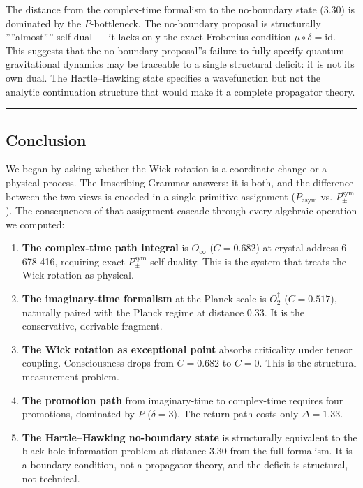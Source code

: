 \documentclass[12pt,a4paper]{article}
\begin{document}
The distance from the complex-time formalism to the no-boundary state (3.30) is dominated by the $P$-bottleneck. The no-boundary proposal is structurally ''''almost'''' self-dual --- it lacks only the exact Frobenius condition $\mu \circ \delta = \text{id}$. This suggests that the no-boundary proposal''s failure to fully specify quantum gravitational dynamics may be traceable to a single structural deficit: it is not its own dual. The Hartle--Hawking state specifies a wavefunction but not the analytic continuation structure that would make it a complete propagator theory.

\begin{center}
\rule{0.5\textwidth}{0.4pt}
\end{center}

\subsection{Conclusion}

We began by asking whether the Wick rotation is a coordinate change or a physical process. The Imscribing Grammar answers: it is both, and the difference between the two views is encoded in a single primitive assignment ($P_{\text{asym}}$ vs. $P_{\pm}^{\text{sym}}$). The consequences of that assignment cascade through every algebraic operation we computed:

\begin{enumerate}
    \item \textbf{The complex-time path integral} is $O_{\infty}$ ($C = 0.682$) at crystal address 6 678 416, requiring exact $P_{\pm}^{\text{sym}}$ self-duality. This is the system that treats the Wick rotation as physical.
    \item \textbf{The imaginary-time formalism} at the Planck scale is $O_2^\dagger$ ($C = 0.517$), naturally paired with the Planck regime at distance 0.33. It is the conservative, derivable fragment.
    \item \textbf{The Wick rotation as exceptional point} absorbs criticality under tensor coupling. Consciousness drops from $C = 0.682$ to $C = 0$. This is the structural measurement problem.
    \item \textbf{The promotion path} from imaginary-time to complex-time requires four promotions, dominated by $P$ ($\delta = 3$). The return path costs only $\Delta = 1.33$.
    \item \textbf{The Hartle--Hawking no-boundary state} is structurally equivalent to the black hole information problem at distance 3.30 from the full formalism. It is a boundary condition, not a propagator theory, and the deficit is structural, not technical.
\end{enumerate}
\end{document}
